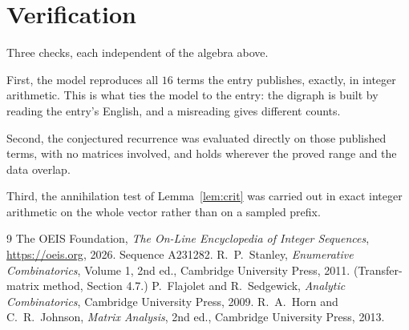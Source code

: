 \documentclass[11pt,a4paper]{article}
\theoremstyle{plain}
\theoremstyle{definition}
\begin{document}
\section{Verification}

Three checks, each independent of the algebra above.

First, the model reproduces all $16$ terms the entry publishes, exactly, in integer
arithmetic. This is what ties the model to the entry: the digraph is built by reading the
entry's English, and a misreading gives different counts.

Second, the conjectured recurrence was evaluated directly on those published terms, with no
matrices involved, and holds wherever the proved range and the data overlap.

Third, the annihilation test of Lemma~\ref{lem:crit} was carried out in exact integer
arithmetic on the whole vector rather than on a sampled prefix.

\begin{thebibliography}{9}
 The OEIS Foundation, \emph{The On-Line Encyclopedia of Integer
Sequences}, \url{https://oeis.org}, 2026. Sequence A231282.
 R.~P.~Stanley, \emph{Enumerative Combinatorics}, Volume 1, 2nd ed.,
Cambridge University Press, 2011. (Transfer-matrix method, Section 4.7.)
 P.~Flajolet and R.~Sedgewick, \emph{Analytic Combinatorics}, Cambridge
University Press, 2009.
 R.~A.~Horn and C.~R.~Johnson, \emph{Matrix Analysis}, 2nd ed., Cambridge
University Press, 2013.
\end{thebibliography}
\end{document}
